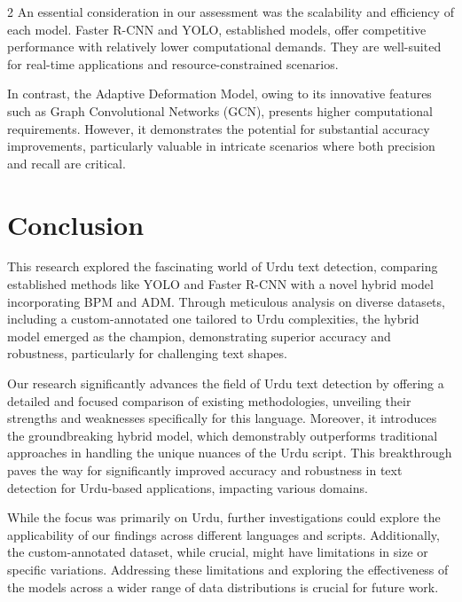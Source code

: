 \documentclass[sn-mathphys,Numbered]{sn-jnl}%
\begin{document}
\begin{multicols}{2}
An essential consideration in our assessment was the scalability and efficiency of each model. Faster R-CNN and YOLO, established models, offer competitive performance with relatively lower computational demands. They are well-suited for real-time applications and resource-constrained scenarios.

In contrast, the Adaptive Deformation Model, owing to its innovative features such as Graph Convolutional Networks (GCN), presents higher computational requirements. However, it demonstrates the potential for substantial accuracy improvements, particularly valuable in intricate scenarios where both precision and recall are critical.

\section{Conclusion}\label{sec13}
This research explored the fascinating world of Urdu text detection, comparing established methods like YOLO and Faster R-CNN with a novel hybrid model incorporating BPM and ADM. Through meticulous analysis on diverse datasets, including a custom-annotated one tailored to Urdu complexities, the hybrid model emerged as the champion, demonstrating superior accuracy and robustness, particularly for challenging text shapes.

Our research significantly advances the field of Urdu text detection by offering a detailed and focused comparison of existing methodologies, unveiling their strengths and weaknesses specifically for this language. Moreover, it introduces the groundbreaking hybrid model, which demonstrably outperforms traditional approaches in handling the unique nuances of the Urdu script. This breakthrough paves the way for significantly improved accuracy and robustness in text detection for Urdu-based applications, impacting various domains.

While the focus was primarily on Urdu, further investigations could explore the applicability of our findings across different languages and scripts. Additionally, the custom-annotated dataset, while crucial, might have limitations in size or specific variations. Addressing these limitations and exploring the effectiveness of the models across a wider range of data distributions is crucial for future work.


\end{multicols}
\end{document}
